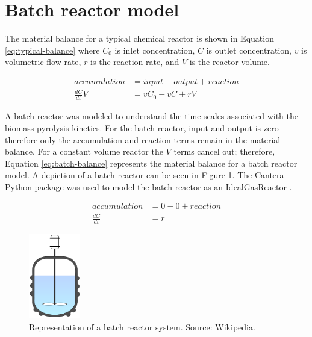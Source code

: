 \documentclass[12pt,titlepage]{article}
\begin{document}
\section{Batch reactor model}

The material balance for a typical chemical reactor is shown in Equation \ref{eq:typical-balance} where $C_0$ is inlet concentration, $C$ is outlet concentration, $v$ is volumetric flow rate, $r$ is the reaction rate, and $V$ is the reactor volume.

\begin{equation}
    \label{eq:typical-balance}
    \begin{aligned}
        accumulation &= input - output + reaction \\
        \frac{dC}{dt} V &= v C_0 - v C + r V
    \end{aligned}
\end{equation}

A batch reactor was modeled to understand the time scales associated with the biomass pyrolysis kinetics. For the batch reactor, input and output is zero therefore only the accumulation and reaction terms remain in the material balance. For a constant volume reactor the $V$ terms cancel out; therefore, Equation \ref{eq:batch-balance} represents the material balance for a batch reactor model. A depiction of a batch reactor can be seen in Figure \ref{fig:batch-reactor}. The Cantera Python package was used to model the batch reactor as an IdealGasReactor \cite{Cantera-2018}.

\begin{equation}
    \label{eq:batch-balance}
    \begin{aligned}
        accumulation &= 0 - 0 + reaction \\
        \frac{dC}{dt} &= r
    \end{aligned}
\end{equation}

\begin{figure}[H]
    \centering
    \includegraphics[width=0.2\textwidth]{figures/batch-reactor.png}
    \caption{Representation of a batch reactor system. Source: Wikipedia.}
    \label{fig:batch-reactor}
\end{figure}
\end{document}

